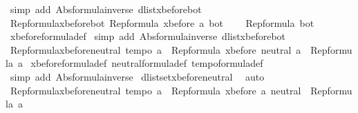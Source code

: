 \begin{isabellebody}
\ {\isacharparenleft}simp\ add{\isacharcolon}\ Abs{\isacharunderscore}formula{\isacharunderscore}inverse\ dlist{\isacharunderscore}xbefore{\isacharunderscore}bot{\isacharunderscore}{}{\isacharparenright}%
\endisatagproof
{\isafoldproof}%
%
\isadelimproof
\isanewline
%
\endisadelimproof
\isanewline
{}\isamarkupfalse%
\ Rep{\isacharunderscore}formula{\isacharunderscore}xbefore{\isacharunderscore}bot{\isacharunderscore}{}{\isacharcolon}\ {\isachardoublequoteopen}Rep{\isacharunderscore}formula\ {\isacharparenleft}xbefore\ a\ bot{\isacharparenright}\ {\isacharequal}\ \isanewline
\ \ Rep{\isacharunderscore}formula\ bot{\isachardoublequoteclose}\isanewline
%
\isadelimproof
%
\endisadelimproof
%
\isatagproof
{}\isamarkupfalse%
\ xbefore{\isacharunderscore}formula{\isacharunderscore}def\isanewline
{}\isamarkupfalse%
\ {\isacharparenleft}simp\ add{\isacharcolon}\ Abs{\isacharunderscore}formula{\isacharunderscore}inverse\ dlist{\isacharunderscore}xbefore{\isacharunderscore}bot{\isacharunderscore}{}{\isacharparenright}%
\endisatagproof
{\isafoldproof}%
%
\isadelimproof
\isanewline
%
\endisadelimproof
\isanewline
{}\isamarkupfalse%
\ Rep{\isacharunderscore}formula{\isacharunderscore}xbefore{\isacharunderscore}neutral{\isacharunderscore}{}{\isacharcolon}\ {\isachardoublequoteopen}tempo{}\ a\ {\isasymLongrightarrow}\ Rep{\isacharunderscore}formula\ {\isacharparenleft}xbefore\ neutral\ a{\isacharparenright}\ {\isacharequal}\ Rep{\isacharunderscore}formula\ a{\isachardoublequoteclose}\isanewline
%
\isadelimproof
%
\endisadelimproof
%
\isatagproof
{}\isamarkupfalse%
\ xbefore{\isacharunderscore}formula{\isacharunderscore}def\ neutral{\isacharunderscore}formula{\isacharunderscore}def\ tempo{}{\isacharunderscore}formula{\isacharunderscore}def\ \isanewline
{}\isamarkupfalse%
\ {\isacharparenleft}simp\ add{\isacharcolon}\ Abs{\isacharunderscore}formula{\isacharunderscore}inverse{\isacharparenright}\isanewline
{}\isamarkupfalse%
\ dlistset{\isacharunderscore}xbefore{\isacharunderscore}neutral{\isacharunderscore}{}\ \isamarkupfalse%
\ auto%
\endisatagproof
{\isafoldproof}%
%
\isadelimproof
\isanewline
%
\endisadelimproof
\isanewline
{}\isamarkupfalse%
\ Rep{\isacharunderscore}formula{\isacharunderscore}xbefore{\isacharunderscore}neutral{\isacharunderscore}{}{\isacharcolon}\ {\isachardoublequoteopen}tempo{}\ a\ {\isasymLongrightarrow}\ Rep{\isacharunderscore}formula\ {\isacharparenleft}xbefore\ a\ neutral{\isacharparenright}\ {\isacharequal}\ Rep{\isacharunderscore}formula\ a{\isachardoublequoteclose}\isanewline

\end{isabellebody}
